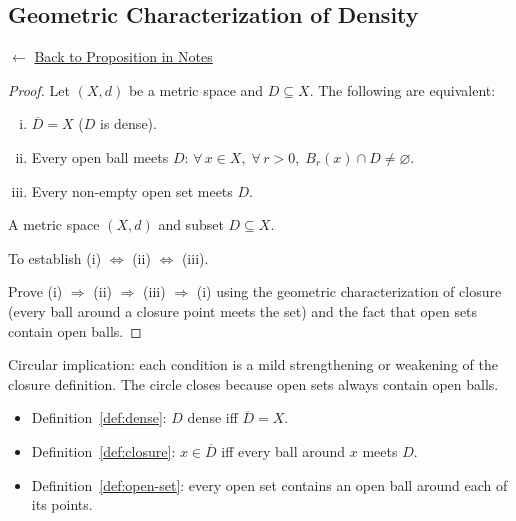 
\subsection*{Geometric Characterization of Density}
\label{prf:dense-equiv}

\begin{remark*}[Return]
$\leftarrow$ \hyperref[prop:dense-equiv]{Back to Proposition in Notes}
\end{remark*}

\begin{proof}
\Claim Let $(X,d)$ be a metric space and $D \subseteq X$.
The following are equivalent:
\begin{enumerate}[(i)]
  \item $\overline{D} = X$ ($D$ is dense).
  \item Every open ball meets $D$: $\forall\, x \in X,\; \forall\, r>0,\; B_r(x) \cap D \neq \varnothing$.
  \item Every non-empty open set meets $D$.
\end{enumerate}

\Given A metric space $(X,d)$ and subset $D \subseteq X$.

\Goal To establish (i) $\Leftrightarrow$ (ii) $\Leftrightarrow$ (iii).

\Strategy Prove (i) $\Rightarrow$ (ii) $\Rightarrow$ (iii) $\Rightarrow$ (i)
using the geometric characterization of closure (every ball around a closure
point meets the set) and the fact that open sets contain open balls.


\end{proof}

\begin{remark*}
Circular implication: each condition is a mild strengthening or weakening
of the closure definition. The circle closes because open sets always
contain open balls.
\end{remark*}

\begin{remark*}[Dependencies]
\begin{itemize}
  \item Definition~\ref{def:dense}: $D$ dense iff $\overline{D} = X$.
  \item Definition~\ref{def:closure}: $x \in \overline{D}$ iff every ball around $x$
        meets $D$.
  \item Definition~\ref{def:open-set}: every open set contains an open ball around
        each of its points.
\end{itemize}
\end{remark*}
